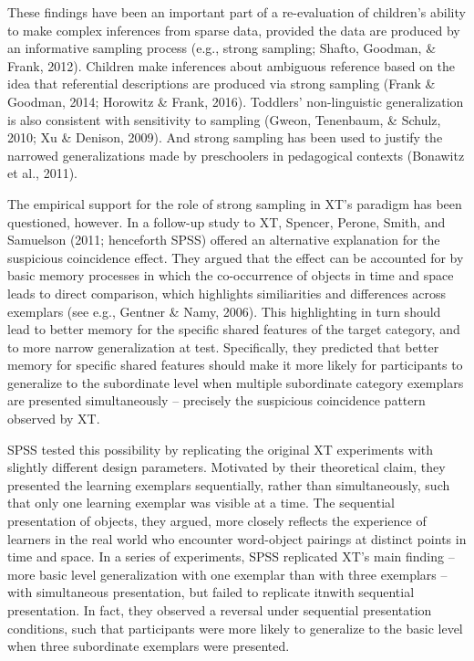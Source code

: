 \documentclass[english,floatsintext,man]{apa6}
\theoremstyle{definition}
\theoremstyle{definition}
\theoremstyle{remark}
\begin{document}
These findings have been an important part of a re-evaluation of
children's ability to make complex inferences from sparse data, provided
the data are produced by an informative sampling process (e.g., strong
sampling; Shafto, Goodman, \& Frank, 2012). Children make inferences
about ambiguous reference based on the idea that referential
descriptions are produced via strong sampling (Frank \& Goodman, 2014;
Horowitz \& Frank, 2016). Toddlers' non-linguistic generalization is
also consistent with sensitivity to sampling (Gweon, Tenenbaum, \&
Schulz, 2010; Xu \& Denison, 2009). And strong sampling has been used to
justify the narrowed generalizations made by preschoolers in pedagogical
contexts (Bonawitz et al., 2011).

The empirical support for the role of strong sampling in XT's paradigm
has been questioned, however. In a follow-up study to XT, Spencer,
Perone, Smith, and Samuelson (2011; henceforth SPSS) offered an
alternative explanation for the suspicious coincidence effect. They
argued that the effect can be accounted for by basic memory processes in
which the co-occurrence of objects in time and space leads to direct
comparison, which highlights similiarities and differences across
exemplars (see e.g., Gentner \& Namy, 2006). This highlighting in turn
should lead to better memory for the specific shared features of the
target category, and to more narrow generalization at test.
Specifically, they predicted that better memory for specific shared
features should make it more likely for participants to generalize to
the subordinate level when multiple subordinate category exemplars are
presented simultaneously -- precisely the suspicious coincidence pattern
observed by XT.

SPSS tested this possibility by replicating the original XT experiments
with slightly different design parameters. Motivated by their
theoretical claim, they presented the learning exemplars sequentially,
rather than simultaneously, such that only one learning exemplar was
visible at a time. The sequential presentation of objects, they argued,
more closely reflects the experience of learners in the real world who
encounter word-object pairings at distinct points in time and space. In
a series of experiments, SPSS replicated XT's main finding -- more basic
level generalization with one exemplar than with three exemplars -- with
simultaneous presentation, but failed to replicate itnwith sequential
presentation. In fact, they observed a reversal under sequential
presentation conditions, such that participants were more likely to
generalize to the basic level when three subordinate exemplars were
presented.
\end{document}
